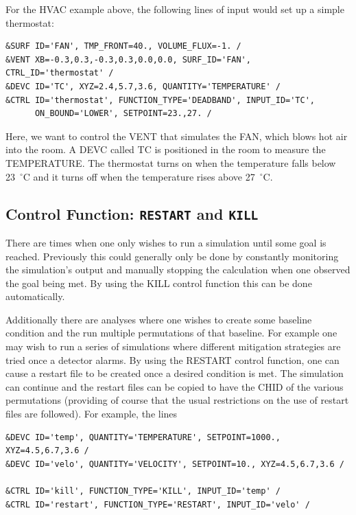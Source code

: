 \documentclass[11pt]{book}
\begin{document}
For the HVAC example above, the following lines of input would set up a simple thermostat:

\footnotesize
\begin{verbatim}
&SURF ID='FAN', TMP_FRONT=40., VOLUME_FLUX=-1. /
&VENT XB=-0.3,0.3,-0.3,0.3,0.0,0.0, SURF_ID='FAN', CTRL_ID='thermostat' /
&DEVC ID='TC', XYZ=2.4,5.7,3.6, QUANTITY='TEMPERATURE' /
&CTRL ID='thermostat', FUNCTION_TYPE='DEADBAND', INPUT_ID='TC',
      ON_BOUND='LOWER', SETPOINT=23.,27. /
\end{verbatim} \normalsize

\noindent
Here, we want to control the {\ct VENT} that simulates the {\ct FAN}, which blows hot air into the room. A {\ct DEVC} called {\ct TC} is
positioned in the room to measure the {\ct TEMPERATURE}. The {\ct thermostat} turns on when the temperature falls below 23~$^\circ$C and it turns
off when the temperature rises above 27~$^\circ$C.



\subsection{Control Function: \texorpdfstring{{\tt RESTART} and {\tt KILL}} {RESTARTKILL} }

There are times when one only wishes to run a simulation until some
goal is reached.  Previously this could generally only be done by
constantly monitoring the simulation's output and manually stopping
the calculation when one observed  the goal being met.  By using the
{\ct KILL} control function this can be done automatically.

Additionally there are analyses where one wishes to create some
baseline condition and the run multiple permutations of that baseline.
For example one may wish to run a series of simulations where
different mitigation strategies are tried once a detector alarms.  By
using the {\ct RESTART} control function, one can cause a restart file
to be created once a desired condition is met.  The simulation can
continue and the restart files can be copied to have the {\ct CHID} of
the various permutations (providing of course that the usual
restrictions on the use of restart files are followed).
For example, the lines

\footnotesize
\begin{verbatim}
&DEVC ID='temp', QUANTITY='TEMPERATURE', SETPOINT=1000., XYZ=4.5,6.7,3.6 /
&DEVC ID='velo', QUANTITY='VELOCITY', SETPOINT=10., XYZ=4.5,6.7,3.6 /

&CTRL ID='kill', FUNCTION_TYPE='KILL', INPUT_ID='temp' /
&CTRL ID='restart', FUNCTION_TYPE='RESTART', INPUT_ID='velo' /
\end{verbatim} \normalsize
\end{document}
